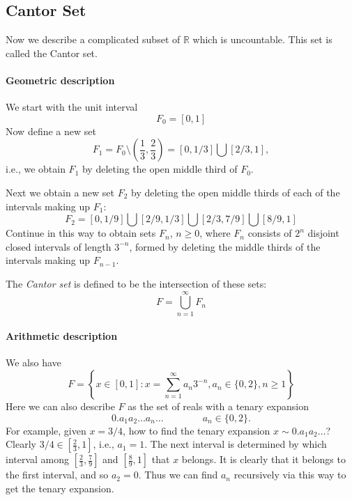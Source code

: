 \subsection{Cantor Set}
Now we describe a complicated subset of $\mathbb{R}$ which is uncountable. This set is called the Cantor set.
\paragraph{Geometric description}
We start with the unit interval
\[
F_0=[0,1]
\]
Now define a new set
\[
F_1 = F_0\setminus(\frac{1}{3},\frac{2}{3})=[0,1/3]\bigcup[2/3,1],
\]
i.e., we obtain $F_1$ by deleting the open middle third of $F_0$.

Next we obtain a new set $F_2$ by deleting the open middle thirds of each of the intervals making up $F_1$:
\[
F_2 = [0,1/9]\bigcup[2/9,1/3]\bigcup[2/3,7/9]\bigcup[8/9,1]
\]
Continue in this way to obtain sets $F_n$, $n\ge 0$, where $F_n$ consists of $2^n$ disjoint closed intervals of length $3^{-n}$, formed by deleting the middle thirds of the intervals making up $F_{n-1}$.

The \emph{Cantor set} is defined to be the intersection of these sets:
\[
F=\bigcup_{n=1}^\infty F_n
\]
\paragraph{Arithmetic description}
We also have
\[
F=\left\{
x\in[0,1]: x=\sum_{n=1}^\infty a_n3^{-n}, a_n\in\{0,2\},n\ge1
\right\}
\]
Here we can also describe $F$ as the set of reals with a tenary expansion
\[
0.a_1a_2\dots a_n\dots\qquad\qquad
a_n\in\{0,2\}.
\]
For example, given $x=3/4$, how to find the tenary expansion $x\sim0.a_1a_2\dots$? Clearly $3/4\in[\frac{2}{3},1]$, i.e., $a_1=1$. The next interval is determined by which interval among $[\frac{2}{3},\frac{7}{9}]$ and $[\frac{8}{9},1]$ that $x$ belongs. It is clearly that it belongs to the first interval, and so $a_2=0$. Thus we can find $a_n$ recursively via this way to get the tenary expansion.



